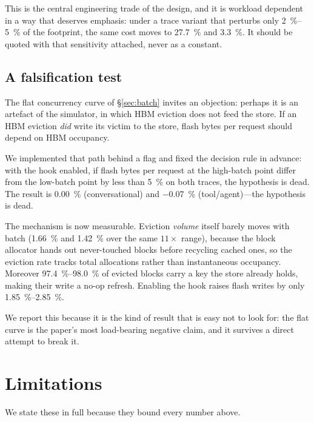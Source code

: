 \documentclass[conference]{IEEEtran}
\begin{document}
This is the central engineering trade of the design, and it is workload
dependent in a way that deserves emphasis: under a trace variant that perturbs
only \SIrange{2}{5}{\percent} of the footprint, the same cost moves to
\SI{27.7}{\percent} and \SI{3.3}{\percent}. It should be quoted with that
sensitivity attached, never as a constant.

\subsection{A falsification test}\label{sec:falsifier}

The flat concurrency curve of \S\ref{sec:batch} invites an objection: perhaps it
is an artefact of the simulator, in which HBM eviction does not feed the store.
If an HBM eviction \emph{did} write its victim to the store, flash bytes per
request should depend on HBM occupancy.

We implemented that path behind a flag and fixed the decision rule in advance:
with the hook enabled, if flash bytes per request at the high-batch point differ
from the low-batch point by less than \SI{5}{\percent} on both traces, the
hypothesis is dead. The result is \SI{+0.00}{\percent} (conversational) and
\SI{-0.07}{\percent} (tool/agent)---the hypothesis is dead.

The mechanism is now measurable. Eviction \emph{volume} itself barely moves with
batch (\SI{+1.66}{\percent} and \SI{+1.42}{\percent} over the same $11\times$
range), because the block allocator hands out never-touched blocks before
recycling cached ones, so the eviction rate tracks total allocations rather than
instantaneous occupancy. Moreover \SIrange{97.4}{98.0}{\percent} of evicted
blocks carry a key the store already holds, making their write a no-op refresh.
Enabling the hook raises flash writes by only
\SIrange{1.85}{2.85}{\percent}.

We report this because it is the kind of result that is easy not to look for:
the flat curve is the paper's most load-bearing negative claim, and it survives
a direct attempt to break it.

\section{Limitations}\label{sec:limits}
We state these in full because they bound every number above.
\end{document}
